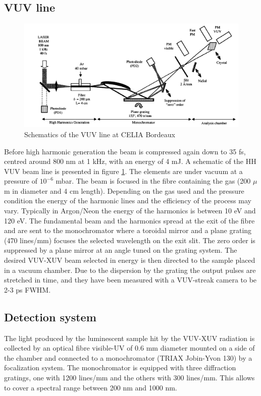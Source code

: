 \subsection{VUV line}

\begin{figure}[htbp]
\begin{center}
\includegraphics[width=14cm]{../Pictures/Chapter_7/VUV_line.png}
\end{center}
\caption[VUV line]{Schematics of the VUV line at CELIA Bordeaux}
\label{fig:VUV_line}
\end{figure}
Before high harmonic generation the beam is compressed again down to 35 fs, centred around 800 nm at 1 kHz, with an energy of 4 mJ.
A schematic of the HH VUV beam line is presented in figure \ref{fig:VUV_line}.
The elements are under vacuum at a pressure of $10^{-6}$ mbar. The beam is focused in the fibre containing the gas (200 $\mu$m in diameter and 4 cm length). Depending on the gas used and the pressure condition the energy of the harmonic lines and the efficiency of the process may vary. Typically in Argon/Neon the energy of the harmonics is between 10 eV and 120 eV.
The fundamental beam and the harmonics spread at the exit of the fibre and are sent to the monochromator where a toroidal mirror and a plane grating (470 lines/mm) focuses the selected wavelength on the exit slit.
The zero order is suppressed by a plane mirror at an angle tuned on the grating system.
The desired VUV-XUV beam selected in energy is then directed to the sample placed in a vacuum chamber. Due to the dispersion by the grating the output pulses are stretched in time, and they have been measured with a VUV-streak camera to be 2-3 ps FWHM.

\subsection{Detection system}
The light produced by the luminescent sample hit by the VUV-XUV radiation is collected by an optical fibre visible-UV of 0.6 mm diameter mounted on a side of the chamber and connected to a monochromator (TRIAX Jobin-Yvon 130) by a focalization system.
The monochromator is equipped with three diffraction gratings, one with 1200 lines/mm and the others with 300 lines/mm. This allows to cover a spectral range between 200 nm and 1000 nm.

